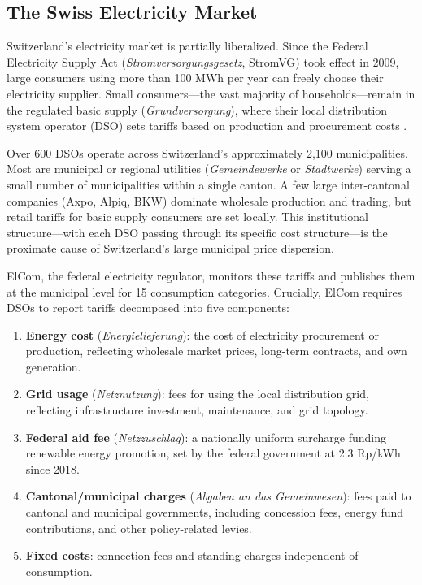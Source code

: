 \documentclass[12pt]{article}
\begin{document}
\subsection{The Swiss Electricity Market}

Switzerland's electricity market is partially liberalized. Since the Federal Electricity Supply Act (\textit{Stromversorgungsgesetz}, StromVG) took effect in 2009, large consumers using more than 100 MWh per year can freely choose their electricity supplier. Small consumers---the vast majority of households---remain in the regulated basic supply (\textit{Grundversorgung}), where their local distribution system operator (DSO) sets tariffs based on production and procurement costs \citep{elcom2024}.

Over 600 DSOs operate across Switzerland's approximately 2,100 municipalities. Most are municipal or regional utilities (\textit{Gemeindewerke} or \textit{Stadtwerke}) serving a small number of municipalities within a single canton. A few large inter-cantonal companies (Axpo, Alpiq, BKW) dominate wholesale production and trading, but retail tariffs for basic supply consumers are set locally. This institutional structure---with each DSO passing through its specific cost structure---is the proximate cause of Switzerland's large municipal price dispersion.

ElCom, the federal electricity regulator, monitors these tariffs and publishes them at the municipal level for 15 consumption categories. Crucially, ElCom requires DSOs to report tariffs decomposed into five components:
\begin{enumerate}
    \item \textbf{Energy cost} (\textit{Energielieferung}): the cost of electricity procurement or production, reflecting wholesale market prices, long-term contracts, and own generation.
    \item \textbf{Grid usage} (\textit{Netznutzung}): fees for using the local distribution grid, reflecting infrastructure investment, maintenance, and grid topology.
    \item \textbf{Federal aid fee} (\textit{Netzzuschlag}): a nationally uniform surcharge funding renewable energy promotion, set by the federal government at 2.3 Rp/kWh since 2018.
    \item \textbf{Cantonal/municipal charges} (\textit{Abgaben an das Gemeinwesen}): fees paid to cantonal and municipal governments, including concession fees, energy fund contributions, and other policy-related levies.
    \item \textbf{Fixed costs}: connection fees and standing charges independent of consumption.
\end{enumerate}
\end{document}
